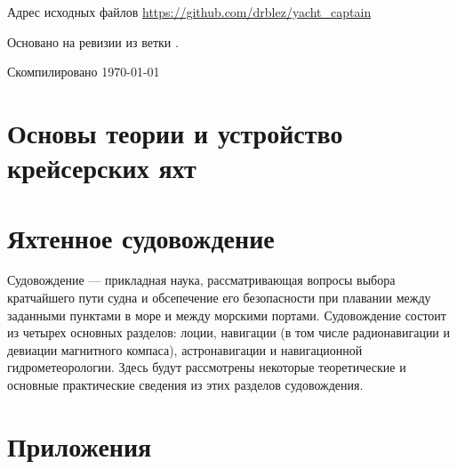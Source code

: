 \documentclass[a4paper, 12pt, twoside, final, book, russian, fittopage, cyremdash, openright]{ncc}
\begin{document}
\frontmatter



\newpage

Адрес исходных файлов \url{https://github.com/drblez/yacht_captain}

Основано на ревизии \texttt{\commit} из ветки \texttt{\branch}.

Скомпилировано \today

{\small \tableofcontents}
{\small \listoffigures}
{\small \listoftables}

\mainmatter

\part{Основы теории и устройство крейсерских яхт}






\part{Яхтенное судовождение}

Судовождение --- прикладная наука, рассматривающая вопросы выбора кратчайшего пути судна и обсепечение его безопасности при плавании между заданными пунктами в море и между морскими портами. Судовождение состоит из четырех основных разделов: лоции, навигации (в том числе радионавигации и девиации магнитного компаса), астронавигации и навигационной гидрометеорологии. Здесь будут рассмотрены некоторые теоретические и основные практические сведения из этих разделов судовождения.








\part{Приложения}






\printindex
\end{document}
